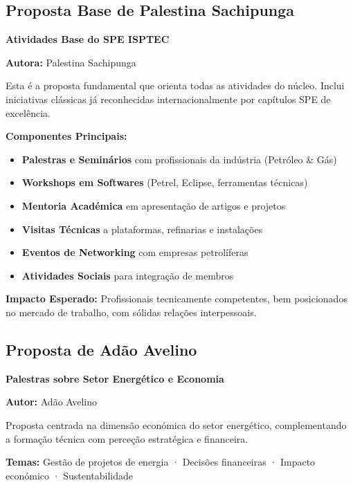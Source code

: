 \documentclass[12pt,a4paper,oneside]{article}
\begin{document}
\subsection{Proposta Base de Palestina Sachipunga}

\noindent\colorbox{spe-light}{%
\begin{minipage}{\textwidth}

\textbf{\color{spe-primary}Atividades Base do SPE ISPTEC}

\medskip

\textbf{Autora:} Palestina Sachipunga

\medskip

Esta é a proposta fundamental que orienta todas as atividades do núcleo. Inclui iniciativas clássicas já reconhecidas internacionalmente por capítulos SPE de excelência.

\medskip

\textbf{Componentes Principais:}

\begin{itemize}
  \item \textbf{Palestras e Seminários} com profissionais da indústria (Petróleo \& Gás)
  \item \textbf{Workshops em Softwares} (Petrel, Eclipse, ferramentas técnicas)
  \item \textbf{Mentoria Académica} em apresentação de artigos e projetos
  \item \textbf{Visitas Técnicas} a plataformas, refinarias e instalações
  \item \textbf{Eventos de Networking} com empresas petrolíferas
  \item \textbf{Atividades Sociais} para integração de membros
\end{itemize}

\textbf{Impacto Esperado:} Profissionais tecnicamente competentes, bem posicionados no mercado de trabalho, com sólidas relações interpessoais.

\end{minipage}%
}

\vspace{1.5cm}

\subsection{Proposta de Adão Avelino}

\noindent\colorbox{caixa-azul}{%
\begin{minipage}{\textwidth}

\textbf{\color{spe-primary}Palestras sobre Setor Energético e Economia}

\medskip

\textbf{Autor:} Adão Avelino

\medskip

Proposta centrada na dimensão económica do setor energético, complementando a formação técnica com perceção estratégica e financeira.

\medskip

\textbf{Temas:} Gestão de projetos de energia · Decisões financeiras · Impacto económico · Sustentabilidade

\end{minipage}%
}
\end{document}
